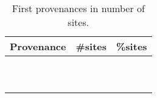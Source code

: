 \documentclass[screen,acmsmall]{acmart}%
\begin{document}
\begin{wraptable}{r}{5cm}\small\centering
	\begin{tabular}{|c|c|c|}
		\hline
		Provenance & \#sites & \%sites \\
		\hline
		\packageProvenanceNamea & \packageNbProvenanceSitesa & \packagePercentProvenanceSitesa \\
		\packageProvenanceNameb & \packageNbProvenanceSitesb & \packagePercentProvenanceSitesb \\
		\packageProvenanceNamec & \packageNbProvenanceSitesc & \packagePercentProvenanceSitesc \\
		\packageProvenanceNamee & \packageNbProvenanceSitese & \packagePercentProvenanceSitese \\
		\packageProvenanceNamef & \packageNbProvenanceSitesf & \packagePercentProvenanceSitesf \\
		\packageProvenanceNameg & \packageNbProvenanceSitesg & \packagePercentProvenanceSitesg \\
		\packageProvenanceNameh & \packageNbProvenanceSitesh & \packagePercentProvenanceSitesh \\
		\packageProvenanceNamei & \packageNbProvenanceSitesi & \packagePercentProvenanceSitesi \\
		\packageProvenanceNamel & \packageNbProvenanceSitesl & \packagePercentProvenanceSitesl \\
		\packageProvenanceNamen & \packageNbProvenanceSitesn & \packagePercentProvenanceSitesn \\
		\hline
	\end{tabular}
	\caption{First provenances in number of sites.} \label{tab:detailed_provenances}
\end{wraptable}
\end{document}
